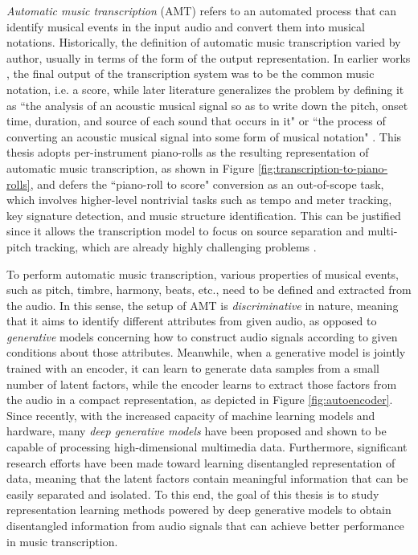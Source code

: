 \emph{Automatic music transcription} (AMT) refers to an automated process that can identify musical events in the input audio and convert them into musical notations.
Historically, the definition of automatic music transcription varied by author, usually in terms of the form of the output representation.
In earlier works \cite{moorer1977transcription,piszczalski1977transcription}, the final output of the transcription system was to be the common music notation, i.e. a score, while later literature generalizes the problem by defining it as ``the analysis of an acoustic musical signal so as to write down the pitch, onset time, duration, and source of each sound that occurs in it" \cite{klapuri2006transcription} or ``the process of converting an acoustic musical signal into some form of musical notation" \cite{benetos2013amt}.
This thesis adopts per-instrument piano-rolls as the resulting representation of automatic music transcription, as shown in Figure \ref{fig:transcription-to-piano-rolls}, and defers the ``piano-roll to score" conversion as an out-of-scope task, which involves higher-level nontrivial tasks such as tempo and meter tracking, key signature detection, and music structure identification.
This can be justified since it allows the transcription model to focus on source separation and multi-pitch tracking, which are already highly challenging problems \cite{cemgil2006generative}.


To perform automatic music transcription, various properties of musical events, such as pitch, timbre, harmony, beats, etc., need to be defined and extracted from the audio.
In this sense, the setup of AMT is \emph{discriminative} in nature, meaning that it aims to identify different attributes from given audio, as opposed to \emph{generative} models concerning how to construct audio signals according to given conditions about those attributes.
Meanwhile, when a generative model is jointly trained with an encoder, it can learn to generate data samples from a small number of latent factors, while the encoder learns to extract those factors from the audio in a compact representation, as depicted in Figure \ref{fig:autoencoder}.
Since recently, with the increased capacity of machine learning models and hardware, many \emph{deep generative models} have been proposed and shown to be capable of processing high-dimensional multimedia data.
Furthermore, significant research efforts have been made toward learning disentangled representation of data, meaning that the latent factors contain meaningful information that can be easily separated and isolated.
To this end, the goal of this thesis is to study representation learning methods powered by deep generative models to obtain disentangled information from audio signals that can achieve better performance in music transcription.

